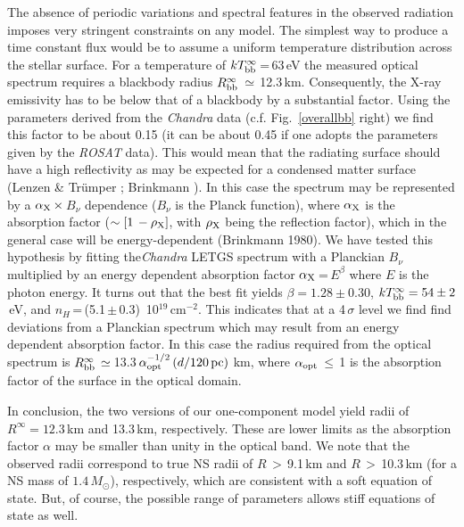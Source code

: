 \documentclass[twocolumn]{aa}
\newcommand{\modi}[1]{{#1}}
\begin{document}
The absence of periodic variations and spectral features in 
the observed radiation imposes very stringent constraints on 
any model. 
The simplest way to produce a time constant flux would be to 
assume a uniform temperature distribution across the stellar 
surface.
For a temperature of $kT^{\infty}_{\rm bb}$\,=\,63\,eV the
measured optical spectrum requires a blackbody radius 
$R_{\rm bb}^{\infty}$\,$\simeq$\,12.3\,km. 
Consequently, the X-ray emissivity has to be below that of a 
blackbody by a substantial factor.
Using the parameters derived from the {\sl Chandra} data 
(c.f. Fig.~\ref{overallbb} right) we find this factor to be about 
0.15 (it can be about 0.45 if one adopts the parameters given 
by the {\sl ROSAT} data).
This would mean that the radiating surface should have a high 
reflectivity as may be expected for a condensed matter surface
(Lenzen \& Tr\"umper \cite{LenTru78}; Brinkmann \cite{Bri80}).
In this case the spectrum may be represented by a
$\alpha_{\rm X}\,\times$\,$B_\nu$ dependence ($B_\nu$ is the 
Planck function), where $\alpha_{\rm X}$ is the absorption 
\modi{factor} ($\sim[1\,-\rho_{\rm X}]$, with $\rho_{\rm X}$ being
the reflection \modi{factor}), which in the general case will be 
energy-dependent (Brinkmann 1980).
We have tested this hypothesis by \modi{fitting the{\em Chandra} 
LETGS spectrum with a Planckian $B_\nu$ multiplied  by an energy 
dependent absorption factor $\alpha_{\rm X}$\,=\,$E^\beta$ where
$E$ is the photon energy.}
It turns out that the best fit yields $\beta=1.28\pm 0.30$, 
$kT^{\infty}_{\rm bb}=54\pm 2$\,eV, and 
\modi{$n_H$\,=\,(5.1\,$\pm$\,0.3)\, 10$^{19}$\,cm$^{-2}$.
This indicates that at a 4\,$\sigma$ level we find
find deviations from a Planckian spectrum which may result 
from an energy dependent absorption factor.}
In this case the radius required from the optical spectrum is 
$R_{\rm bb}^{\infty}\,\simeq$\,13.3\,$\alpha_{\rm opt}^{-1/2}\,
(d/120\,{\rm pc})$ km, where $\alpha_{\rm opt}$\,$\le$\,1
is the absorption \modi{factor} of the surface in the optical domain.

In conclusion, the two versions of our one-component model yield 
radii \modi{ of $R^{\infty}=12.3$\,km and 13.3\,km, respectively.
These are lower limits as the absorption factor $\alpha$ may be 
smaller than unity in the optical band.}
\modi{We note that the observed radii} correspond \modi{to true} NS radii of 
$R\,>$\,9.1\,km and $R\,>$\,10.3\,km (for a NS mass of 
$1.4\, M_\odot$), respectively, which are consistent with a soft 
equation of state. 
But, of course, the possible range of parameters allows 
stiff equations of state as well.
\end{document}
